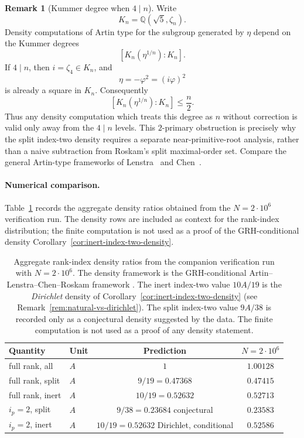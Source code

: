 \documentclass[11pt]{amsart}
\theoremstyle{plain}
\theoremstyle{definition}
\newtheorem{remark}[theorem]{Remark}
\begin{document}
\begin{remark}[Kummer degree when \(4\mid n\)]\label{rem:kummer-halving}
Write
\[
  K_n=\mathbb Q(\sqrt5,\zeta_n).
\]
Density computations of Artin type for the subgroup generated by
\(\eta\) depend on the Kummer degrees
\[
  [K_n(\eta^{1/n}):K_n].
\]
If \(4\mid n\), then \(i=\zeta_4\in K_n\), and
\[
  \eta=-\varphi^{2}=(i\varphi)^2
\]
is already a square in \(K_n\).  Consequently
\[
  [K_n(\eta^{1/n}):K_n]\le \frac n2.
\]
Thus any density computation which treats this degree as \(n\) without
correction is valid only away from the \(4\mid n\) levels.  This
\(2\)-primary obstruction is precisely why the split index-two density
requires a separate near-primitive-root analysis, rather than a naive
subtraction from Roskam's split maximal-order set.  Compare the
general Artin-type frameworks of Lenstra~\cite{Lenstra1977} and
Chen~\cite{Chen2002}.
\end{remark}

\paragraph{Numerical comparison.}
Table~\ref{tab:density} records the aggregate density ratios obtained
from the \(N=2\cdot10^{6}\) verification run.  The density rows are
included as context for the rank-index distribution; the finite
computation is not used as a proof of the GRH-conditional density
Corollary~\ref{cor:inert-index-two-density}.

\begin{table}[ht]
\centering
\small
\begin{tabular}{@{}llcc@{}}
\toprule
Quantity & Unit & Prediction & \(N=2\cdot10^{6}\) \\
\midrule
full rank, all & \(A\) & \(1\) & \(1.00128\) \\
full rank, split & \(A\) & \(9/19=0.47368\) & \(0.47415\) \\
full rank, inert & \(A\) & \(10/19=0.52632\) & \(0.52713\) \\
\midrule
\(i_p=2\), split & \(A\) & \(9/38=0.23684\) conjectural & \(0.23583\) \\
\(i_p=2\), inert & \(A\) & \(10/19=0.52632\) Dirichlet, conditional & \(0.52586\) \\
\bottomrule
\end{tabular}
\caption{Aggregate rank-index density ratios from the companion
verification run with \(N=2\cdot10^{6}\).  The density framework is the
GRH-conditional Artin--Lenstra--Chen--Roskam framework
\cite{Lenstra1977,Chen2002,Roskam2000}.  The inert index-two value
\(10A/19\) is the \emph{Dirichlet} density of
Corollary~\ref{cor:inert-index-two-density}
(see Remark~\ref{rem:natural-vs-dirichlet}).  The split index-two value
\(9A/38\) is recorded only as a conjectural density suggested by the
data.  The finite computation is not used as a proof of any density
statement.}
\label{tab:density}
\end{table}
\end{document}
